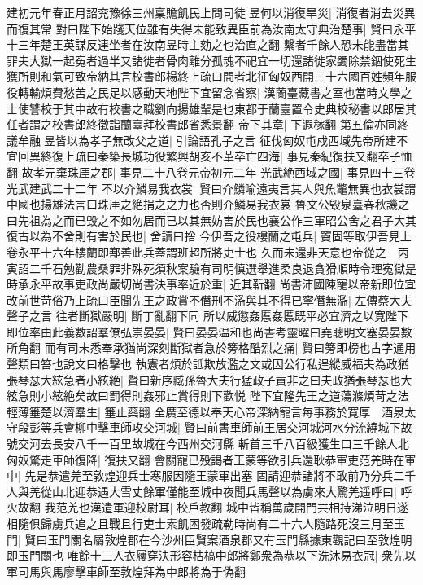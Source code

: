 建初元年春正月詔兖豫徐三州稟贍飢民上問司徒昱何以消復旱災|{
	消復者消去災異而復其常}
對曰陛下始踐天位雖有失得未能致異臣前為汝南太守典治楚事|{
	賢曰永平十三年楚王英謀反連坐者在汝南昱時主劾之也治直之翻}
繫者千餘人恐未能盡當其罪夫大獄一起寃者過半又諸徙者骨肉離分孤魂不祀宜一切還諸徙家蠲除禁錮使死生獲所則和氣可致帝納其言校書郎楊終上疏曰間者北征匈奴西開三十六國百姓頻年服役轉輸煩費愁苦之民足以感動天地陛下宜留念省察|{
	漢蘭臺藏書之室也當時文學之士使讐校于其中故有校書之職劉向揚雄輩是也東都于蘭臺置令史典校秘書以郎居其任者謂之校書郎終徵詣蘭臺拜校書郎省悉景翻}
帝下其章|{
	下遐稼翻}
第五倫亦同終議牟融昱皆以為孝子無改父之道|{
	引論語孔子之言}
征伐匈奴屯戍西域先帝所建不宜回異終復上疏曰秦築長城功役繁興胡亥不革卒亡四海|{
	事見秦紀復扶又翻卒子恤翻}
故孝元棄珠厓之郡|{
	事見二十八卷元帝初元二年}
光武絶西域之國|{
	事見四十三卷光武建武二十二年}
不以介鱗易我衣裳|{
	賢曰介鱗喻遠夷言其人與魚鼈無異也衣裳謂中國也揚雄法言曰珠厓之絶捐之之力也否則介鱗易我衣裳}
魯文公毁泉臺春秋譏之曰先祖為之而已毁之不如勿居而已以其無妨害於民也襄公作三軍昭公舍之君子大其復古以為不舍則有害於民也|{
	舍讀曰捨}
今伊吾之役樓蘭之屯兵|{
	竇固等取伊吾見上卷永平十六年樓蘭即鄯善此兵蓋謂班超所將吏士也}
久而未還非天意也帝從之　丙寅詔二千石勉勸農桑罪非殊死須秋案驗有司明慎選舉進柔良退貪猾順時令理寃獄是時承永平故事吏政尚嚴切尚書決事率近於重|{
	近其靳翻}
尚書沛國陳寵以帝新即位宜改前世苛俗乃上疏曰臣聞先王之政賞不僭刑不濫與其不得已寧僭無濫|{
	左傳蔡大夫聲子之言}
往者斷獄嚴明|{
	斷丁亂翻下同}
所以威懲姦慝姦慝既平必宜濟之以寛陛下即位率由此義數詔羣僚弘崇晏晏|{
	賢曰晏晏温和也尚書考靈曜曰堯聰明文塞晏晏數所角翻}
而有司未悉奉承猶尚深刻斷獄者急於篣格酷烈之痛|{
	賢曰篣即榜也古字通用聲類曰笞也說文曰格擊也}
執憲者煩於詆欺放濫之文或因公行私逞縱威福夫為政猶張琴瑟大絃急者小絃絶|{
	賢曰新序臧孫魯大夫行猛政子貢非之曰夫政猶張琴瑟也大絃急則小絃絶矣故曰罰得則姦邪止賞得則下歡悦}
陛下宜隆先王之道蕩滌煩苛之法輕薄箠楚以濟羣生|{
	箠止蘂翻}
全廣至德以奉天心帝深納寵言每事務於寛厚　酒泉太守段彭等兵會柳中擊車師攻交河城|{
	賢曰前書車師前王居交河城河水分流繞城下故號交河去長安八千一百里故城在今西州交河縣}
斬首三千八百級獲生口三千餘人北匈奴驚走車師復降|{
	復扶又翻}
會關寵已殁謁者王蒙等欲引兵還耿恭軍吏范羌時在軍中|{
	先是恭遣羌至敦煌迎兵士寒服因隨王蒙軍出塞}
固請迎恭諸將不敢前乃分兵二千人與羌從山北迎恭遇大雪丈餘軍僅能至城中夜聞兵馬聲以為虜來大驚羌遥呼曰|{
	呼火故翻}
我范羌也漢遣軍迎校尉耳|{
	校戶教翻}
城中皆稱萬歲開門共相持涕泣明日遂相隨俱歸虜兵追之且戰且行吏士素飢困發疏勒時尚有二十六人隨路死沒三月至玉門|{
	賢曰玉門關名屬敦煌郡在今沙州臣賢案酒泉郡又有玉門縣據東觀記曰至敦煌明即玉門關也}
唯餘十三人衣屨穿決形容枯槁中郎將鄭衆為恭以下洗沐易衣冠|{
	衆先以軍司馬與馬廖擊車師至敦煌拜為中郎將為于偽翻}
